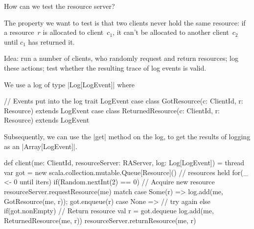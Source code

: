 
\begin{slide}

How can we test the resource server?  

The property we want to test is that two clients never hold the same resource:
if a resource~$r$ is allocated to client~$c_1$, it can't be allocated to
another client~$c_2$ until $c_1$ has returned it.

Idea: run a number of clients, who randomly request and return resources; log
these actions; test whether the resulting trace of log events is valid.
\end{slide}


\begin{slide}

We use a log of type |Log[LogEvent]| where
\begin{scala}
  // Events put into the log
  trait LogEvent
  case class GotResource(c: ClientId, r: Resource) extends LogEvent
  case class ReturnedResource(c: ClientId, r: Resource) extends LogEvent
\end{scala}

Subsequently, we can use the |get| method on the log, to get the
results of logging as an |Array[LogEvent]|.  
\end{slide}


\begin{slide}

\begin{scala}
  def client(me: ClientId, resourceServer: RAServer, log: Log[LogEvent]) = thread{
    var got = new scala.collection.mutable.Queue[Resource]() // resources held
    for(_ <- 0 until iters){
      if(Random.nextInt(2) == 0){        // Acquire new resource
	resourceServer.requestResource(me) match{
          case Some(r) =>  log.add(me, GotResource(me, r)); got.enqueue(r)
          case None => {}  // try again
        }
      }
      else if(got.nonEmpty){    	// Return resource
	val r = got.dequeue
        log.add(me, ReturnedResource(me, r))
	resourceServer.returnResource(me, r)
      }
    }
  }
\end{scala}
\end{slide}  



